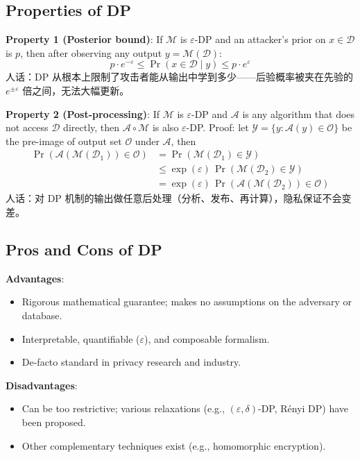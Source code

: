 \documentclass[UTF8]{ctexart}
\begin{document}
\subsection{Properties of DP}

\textbf{Property 1 (Posterior bound)}: If $\mathcal{M}$ is $\varepsilon$-DP and an attacker's prior on $x \in \mathcal{D}$ is $p$, then after observing any output $y = \mathcal{M}(\mathcal{D})$:
\[
    p \cdot e^{-\varepsilon} \leq \Pr(x \in \mathcal{D} \mid y) \leq p \cdot e^{\varepsilon}
\]
人话：DP 从根本上限制了攻击者能从输出中学到多少——后验概率被夹在先验的 $e^{\pm\varepsilon}$ 倍之间，无法大幅更新。

\textbf{Property 2 (Post-processing)}: If $\mathcal{M}$ is $\varepsilon$-DP and $\mathcal{A}$ is any algorithm that does not access $\mathcal{D}$ directly, then $\mathcal{A} \circ \mathcal{M}$ is also $\varepsilon$-DP. Proof: let $\mathcal{Y} = \{y : \mathcal{A}(y) \in \mathcal{O}\}$ be the pre-image of output set $\mathcal{O}$ under $\mathcal{A}$, then
\begin{align*}
    \Pr(\mathcal{A}(\mathcal{M}(\mathcal{D}_1)) \in \mathcal{O})
    &= \Pr(\mathcal{M}(\mathcal{D}_1) \in \mathcal{Y}) \\
    &\leq \exp(\varepsilon)\,\Pr(\mathcal{M}(\mathcal{D}_2) \in \mathcal{Y}) \\
    &= \exp(\varepsilon)\,\Pr(\mathcal{A}(\mathcal{M}(\mathcal{D}_2)) \in \mathcal{O})
\end{align*}
人话：对 DP 机制的输出做任意后处理（分析、发布、再计算），隐私保证不会变差。

\subsection{Pros and Cons of DP}

\textbf{Advantages}:
\begin{itemize}
    \item Rigorous mathematical guarantee; makes no assumptions on the adversary or database.
    \item Interpretable, quantifiable ($\varepsilon$), and composable formalism.
    \item De-facto standard in privacy research and industry.
\end{itemize}

\textbf{Disadvantages}:
\begin{itemize}
    \item Can be too restrictive; various relaxations (e.g., $(\varepsilon,\delta)$-DP, Rényi DP) have been proposed.
    \item Other complementary techniques exist (e.g., homomorphic encryption).
\end{itemize}
\end{document}
